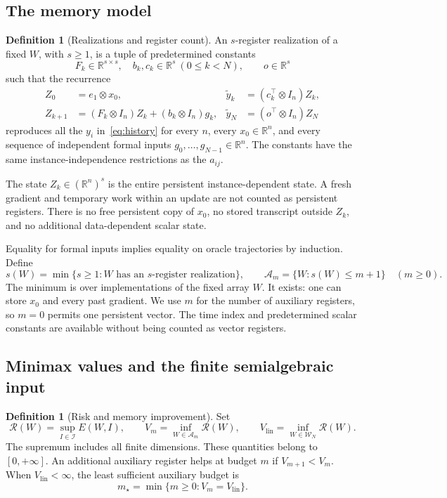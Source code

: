 \documentclass[11pt]{article}
\numberwithin{equation}{section}
\theoremstyle{definition}
\newtheorem{definition}[theorem]{Definition}
\newcommand{\R}{\mathbb R}
\newcommand{\W}{\mathcal W_N}
\newcommand{\A}{\mathcal A}
\newcommand{\risk}{\mathcal R}
\begin{document}
\subsection{The memory model}
\begin{definition}[Realizations and register count]\label{def:memory}
An $s$-register realization of a fixed $W$, with $s\ge1$, is a tuple of predetermined constants
\[
 F_k\in\R^{s\times s},\quad b_k,c_k\in\R^s\ (0\le k<N),
 \qquad o\in\R^s
\]
such that the recurrence
\begin{align}
 Z_0&=e_1\otimes x_0,&
 \widetilde y_k&=(c_k^\top\otimes I_n)Z_k,\nonumber\\
 Z_{k+1}&=(F_k\otimes I_n)Z_k+(b_k\otimes I_n)g_k,&
 \widetilde y_N&=(o^\top\otimes I_n)Z_N
 \label{eq:state}
\end{align}
reproduces all the $y_i$ in~\eqref{eq:history} for every $n$, every $x_0\in\R^n$, and every sequence of independent formal inputs $g_0,\ldots,g_{N-1}\in\R^n$. The constants have the same instance-independence restrictions as the $a_{ij}$.

The state $Z_k\in(\R^n)^s$ is the entire persistent instance-dependent state. A fresh gradient and temporary work within an update are not counted as persistent registers. There is no free persistent copy of $x_0$, no stored transcript outside $Z_k$, and no additional data-dependent scalar state.
\end{definition}

Equality for formal inputs implies equality on oracle trajectories by induction. Define
\begin{equation}
 s(W)=\min\{s\ge1:W\text{ has an }s\text{-register realization}\},
 \qquad
 \A_m=\{W:s(W)\le m+1\}\quad(m\ge0).
 \label{eq:memory-class}
\end{equation}
The minimum is over implementations of the fixed array $W$. It exists: one can store $x_0$ and every past gradient. We use $m$ for the number of auxiliary registers, so $m=0$ permits one persistent vector. The time index and predetermined scalar constants are available without being counted as vector registers.

\subsection{Minimax values and the finite semialgebraic input}
\begin{definition}[Risk and memory improvement]\label{def:values}
Set
\begin{equation}
 \risk(W)=\sup_{I\in\mathscr I}E(W,I),\qquad
 V_m=\inf_{W\in\A_m}\risk(W),\qquad
 V_{\mathrm{lin}}=\inf_{W\in\W}\risk(W).
 \label{eq:values}
\end{equation}
The supremum includes all finite dimensions. These quantities belong to $[0,+\infty]$. An additional auxiliary register helps at budget $m$ if $V_{m+1}<V_m$. When $V_{\mathrm{lin}}<\infty$, the least sufficient auxiliary budget is
\begin{equation}
 m_\star=\min\{m\ge0:V_m=V_{\mathrm{lin}}\}.
 \label{eq:mstar}
\end{equation}
\end{definition}
\end{document}
